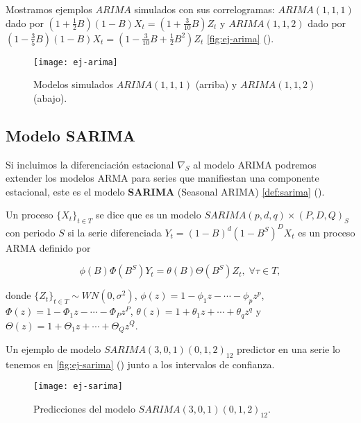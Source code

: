 Mostramos ejemplos $ARIMA$ simulados con sus correlogramas: $ARIMA(1, 1, 1)$ dado por $(1 + \frac{1}{2}B)(1-B)X_t = (1+\frac{3}{10}B)Z_t$ y $ARIMA(1, 1, 2)$ dado por $(1 - \frac{3}{5}B)(1-B)X_t = (1-\frac{3}{10}B+\frac{1}{2}B^2)Z_t$ \autoref{fig:ej-arima} (\cite{chatfield2019analysis}).

\begin{figure}[htpb]
  \centering
  \texttt{[image: ej-arima]}
  \caption{Modelos simulados $ARIMA(1, 1, 1)$ (arriba) y $ARIMA(1, 1, 2)$ (abajo).}
  \label{fig:ej-arima}
\end{figure}

\subsection{Modelo SARIMA}

Si incluimos la diferenciación estacional $\nabla_S$ al modelo ARIMA podremos extender los modelos ARMA para series que manifiestan una componente estacional, este es el modelo \textbf{SARIMA} (Seasonal ARIMA) \autoref{def:sarima} (\cite{box2011time}).

\begin{definicion}
  Un proceso $\{X_t\}_{t \in T}$ se dice que es un modelo $SARIMA(p,d,q)\times(P,D,Q)_S$ con periodo $S$ si la serie diferenciada $Y_t = (1 - B)^d(1 - B^S)^D X_t$ es un proceso ARMA definido por

  $$\phi(B)\Phi(B^S)Y_t = \theta(B)\Theta(B^S)Z_t, \; \forall \tau \in T,$$

  donde $\{Z_t\}_{t \in T} \sim WN(0, \sigma^2)$, $\phi(z) = 1 - \phi_1 z - \cdots - \phi_p z^p$, $\Phi(z) = 1 - \Phi_1z - \cdots - \Phi_P z^P$, $\theta(z) = 1 + \theta_1 z + \cdots + \theta_qz^q$ y $\Theta(z) = 1 + \Theta_1z + \cdots + \Theta_Q z^Q$.
\label{def:sarima}
\end{definicion}

Un ejemplo de modelo $SARIMA(3, 0, 1)(0, 1, 2)_12$ predictor en una serie lo tenemos en \autoref{fig:ej-sarima} (\cite{hyndman2018forecasting}) junto a los intervalos de confianza.

\begin{figure}[htpb]
  \centering
  \texttt{[image: ej-sarima]}
  \caption{Predicciones del modelo $SARIMA(3, 0, 1)(0, 1, 2)_12$.}
  \label{fig:ej-sarima}
\end{figure}

